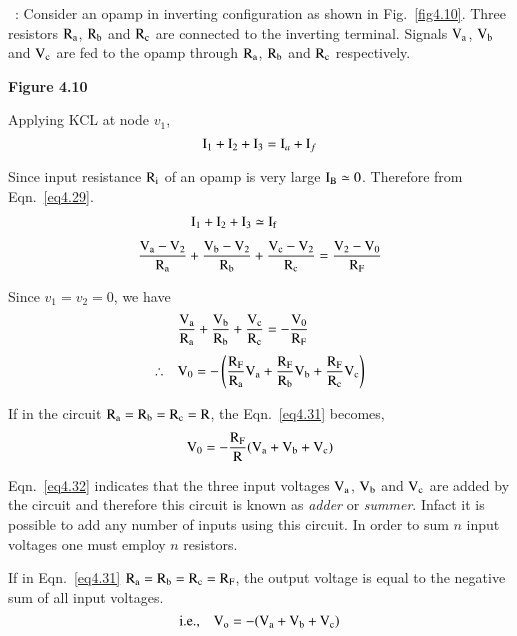 \smallskip
{}~: Consider an opamp in inverting configuration as shown in Fig.~\ref{fig4.10}. Three resistors $\textrm{R}_{\textrm{a}}$, $\textrm{R}_{\textrm{b}}$ and $\textrm{R}_{\textrm{c}}$ are connected to the inverting terminal. Signals $\textrm{V}_{\textrm{a}}$, $\textrm{V}_{\textrm{b}}$ and $\textrm{V}_{\textrm{c}}$ are fed to the opamp through $\textrm{R}_{\textrm{a}}$, $\textrm{R}_{\textrm{b}}$ and $\textrm{R}_{\textrm{c}}$ respectively.
\begin{center}
{\bf Figure 4.10}
\end{center}

Applying KCL at node $v_{1}$, 
\begin{equation}
\textrm{I}_{1}+\textrm{I}_{2}+\textrm{I}_{3}=\textrm{I}_{a}+\textrm{I}_{f}\label{eq4.29}
\end{equation}

Since input resistance $\textrm{R}_{\textrm{i}}$ of an opamp is very large $\textrm{I}_{\textrm{B}}\simeq 0$. Therefore from Eqn.~\eqref{eq4.29}.
\begin{align}
\textrm{I}_{1}+\textrm{I}_{2}+\textrm{I}_{3} &\simeq \textrm{I}_{\textrm{f}}\notag\\[3pt]
\frac{\textrm{V}_{\textrm{a}}-\textrm{V}_{2}}{\textrm{R}_{\textrm{a}}}+\frac{\textrm{V}_{\textrm{b}}-\textrm{V}_{2}}{\textrm{R}_{\textrm{b}}} &+ \frac{\textrm{V}_{\textrm{c}}-\textrm{V}_{2}}{\textrm{R}_{\textrm{c}}}=\frac{\textrm{V}_{2}-\textrm{V}_{0}}{\textrm{R}_{\textrm{F}}}\label{eq4.30}
\end{align}

Since $v_{1}=v_{2}=0$, we have
\begin{align}
& \frac{\textrm{V}_{\textrm{a}}}{\textrm{R}_{\textrm{a}}}+\frac{\textrm{V}_{\textrm{b}}}{\textrm{R}_{\textrm{b}}}+\frac{\textrm{V}_{\textrm{c}}}{\textrm{R}_{\textrm{c}}}=-\frac{\textrm{V}_{0}}{\textrm{R}_{\textrm{F}}}\notag\\[3pt]
\therefore\quad & \textrm{V}_{0}=-\left(\frac{\textrm{R}_{\textrm{F}}}{\textrm{R}_{\textrm{a}}}\textrm{V}_{\textrm{a}}+\frac{\textrm{R}_{\textrm{F}}}{\textrm{R}_{\textrm{b}}}\textrm{V}_{\textrm{b}}+\frac{\textrm{R}_{\textrm{F}}}{\textrm{R}_{\textrm{c}}}\textrm{V}_{\textrm{c}}\right)\label{eq4.31}
\end{align}

If in the circuit $\textrm{R}_{\textrm{a}}=\textrm{R}_{\textrm{b}}=\textrm{R}_{\textrm{c}}=\textrm{R}$, the Eqn.~\eqref{eq4.31} becomes,
\begin{equation}
\textrm{V}_{0}=-\frac{\textrm{R}_{\textrm{F}}}{\textrm{R}}(\textrm{V}_{\textrm{a}}+\textrm{V}_{\textrm{b}}+\textrm{V}_{\textrm{c}})\label{eq4.32}
\end{equation}

Eqn.~\eqref{eq4.32} indicates that the three input voltages $\textrm{V}_{\textrm{a}}$, $\textrm{V}_{\textrm{b}}$ and $\textrm{V}_{\textrm{c}}$ are added by the circuit and therefore this circuit is known as {\em adder} or {\em summer}. Infact it is possible to add any number of inputs using this circuit. In order to sum $n$ input voltages one must employ $n$ resistors.

If in Eqn.~\eqref{eq4.31} $\textrm{R}_{\textrm{a}}=\textrm{R}_{\textrm{b}}=\textrm{R}_{\textrm{c}}=\textrm{R}_{\textrm{F}}$, the output voltage is equal to the negative sum of all input voltages.
\begin{equation}
\text{i.e.,}\quad \textrm{V}_{\textrm{o}}=-(\textrm{V}_{\textrm{a}}+\textrm{V}_{\textrm{b}}+\textrm{V}_{\textrm{c}})\label{eq4.33}
\end{equation}

